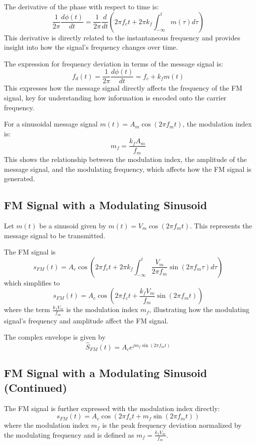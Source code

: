 The derivative of the phase with respect to time is:
\[ \frac{1}{2\pi} \frac{d\phi(t)}{dt} = \frac{1}{2\pi} \frac{d}{dt} \left( 2\pi f_c t + 2\pi k_f \int_{-\infty}^{t} m(\tau) d\tau \right) \]
This derivative is directly related to the instantaneous frequency and provides insight into how the signal's frequency changes over time.

The expression for frequency deviation in terms of the message signal is:
\[ f_d(t) = \frac{1}{2\pi} \frac{d\phi(t)}{dt} = f_c + k_f m(t) \]
This expresses how the message signal directly affects the frequency of the FM signal, key for understanding how information is encoded onto the carrier frequency.

For a sinusoidal message signal \( m(t) = A_m \cos(2\pi f_m t) \), the modulation index is:
\[ m_f = \frac{k_f A_m}{f_m} \]
This shows the relationship between the modulation index, the amplitude of the message signal, and the modulating frequency, which affects how the FM signal is generated.


\subsection*{FM Signal with a Modulating Sinusoid}

Let \( m(t) \) be a sinusoid given by \( m(t) = V_m \cos(2\pi f_m t) \). This represents the message signal to be transmitted.

The FM signal is
\[
s_{FM}(t) = A_c \cos \left( 2\pi f_c t + 2\pi k_f \int_{-\infty}^{t} \frac{V_m}{2\pi f_m} \sin(2\pi f_m \tau) d\tau \right)
\]
which simplifies to
\[
s_{FM}(t) = A_c \cos \left(2\pi f_c t + \frac{k_f V_m}{f_m} \sin(2\pi f_m t) \right)
\]
where the term \( \frac{k_f V_m}{f_m} \) is the modulation index \( m_f \), illustrating how the modulating signal's frequency and amplitude affect the FM signal.

The complex envelope is given by
\[
\hat{S}_{FM}(t) = A_c e^{j m_f \sin(2\pi f_m t)}
\]
\subsection*{FM Signal with a Modulating Sinusoid (Continued)}

The FM signal is further expressed with the modulation index directly:
\[
s_{FM}(t) = A_c \cos \left(2\pi f_c t + m_f \sin(2\pi f_m t) \right)
\]
where the modulation index \( m_f \) is the peak frequency deviation normalized by the modulating frequency and is defined as \( m_f = \frac{k_f V_m}{f_m} \).

